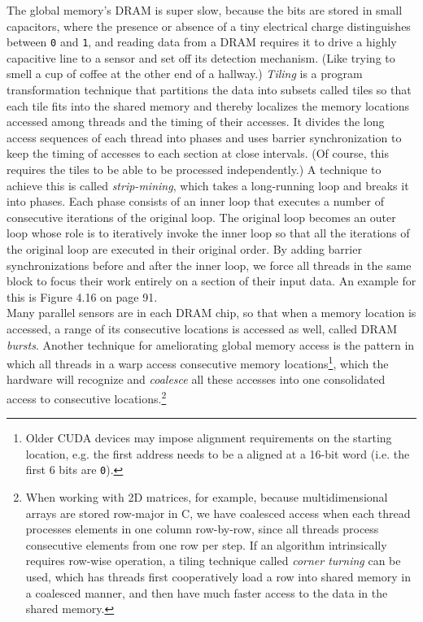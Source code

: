 \documentclass[table, xcdraw]{article}%
\begin{document}
The global memory's DRAM is super slow, because the bits are stored in small capacitors, where the presence or absence of a tiny electrical charge distinguishes between \texttt{0} and \texttt{1}, and reading data from a DRAM requires it to drive a highly capacitive line to a sensor and set off its detection mechanism. (Like trying to smell a cup of coffee at the other end of a hallway.) \emph{Tiling} is a program transformation technique that partitions the data into subsets called tiles so that each tile fits into the shared memory and thereby localizes the memory locations accessed among threads and the timing of their accesses. It divides the long access sequences of each thread into phases and uses barrier synchronization to keep the timing of accesses to each section at close intervals. (Of course, this requires the tiles to be able to be processed independently.) A technique to achieve this is called \emph{strip-mining}, which takes a long-running loop and breaks it into phases. Each phase consists of an inner loop that executes a number of consecutive iterations of the original loop. The original loop becomes an outer loop whose role is to iteratively invoke the inner loop so that all the iterations of the original loop are executed in their original order. By adding barrier synchronizations before and after the inner loop, we force all threads in the same block to focus their work entirely on a section of their input data. An example for this is Figure 4.16 on page 91.\\
Many parallel sensors are in each DRAM chip, so that when a memory location is accessed, a range of its consecutive locations is accessed as well, called DRAM \emph{bursts}. Another technique for ameliorating global memory access is the pattern in which all threads in a warp access consecutive memory locations\footnote{Older CUDA devices may impose alignment requirements on the starting location, e.g. the first address needs to be a aligned at a 16-bit word (i.e. the first 6 bits are \texttt{0}).}, which the hardware will recognize and \emph{coalesce} all these accesses into one consolidated access to consecutive locations.\footnote{When working with 2D matrices, for example, because multidimensional arrays are stored row-major in C, we have coalesced access when each thread processes elements in one column row-by-row, since all threads process consecutive elements from one row per step. If an algorithm intrinsically requires row-wise operation, a tiling technique called \emph{corner turning} can be used, which has threads first cooperatively load a row into shared memory in a coalesced manner, and then have much faster access to the data in the shared memory.}
\end{document}

